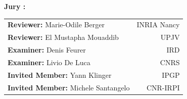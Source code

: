\begin{titlepage}
\noindent \large \textbf{Jury :} \\
\begin{center}
\begin{tabular}{lr}
\textbf{Reviewer:} Marie-Odile Berger & INRIA Nancy\\
\textbf{Reviewer:} El Mustapha Mouaddib & UPJV\\
\textbf{Examiner:} Denis Feurer & IRD\\
\textbf{Examiner:} Livio De Luca & CNRS\\
\textbf{Invited Member:} Yann Klinger & IPGP\\
\textbf{Invited Member:} Michele Santangelo & CNR-IRPI\\
\end{tabular}

\end{center}
\end{titlepage}

\sloppy

\titlepage

\restoregeometry